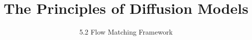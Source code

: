 ﻿%

\graphicspath{{../images/}}
\title{The Principles of Diffusion Models}
\subtitle{5.2 Flow Matching Framework}


\begin{frame}
    \titlepage
\end{frame}



